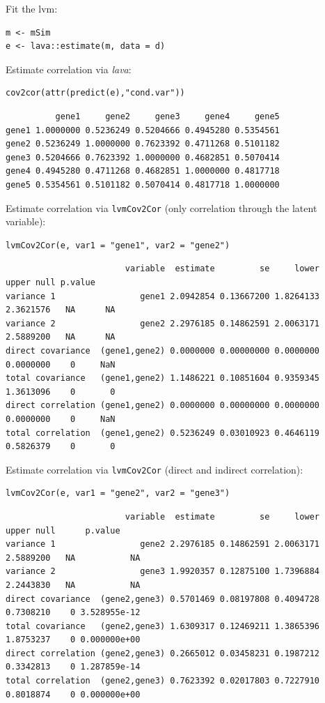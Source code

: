 \documentclass{article}
\begin{document}
Fit the lvm:
\lstset{language=r,label= ,caption= ,captionpos=b,numbers=none}
\begin{lstlisting}
m <- mSim
e <- lava::estimate(m, data = d)
\end{lstlisting}
Estimate correlation via \emph{lava}:
\lstset{language=r,label= ,caption= ,captionpos=b,numbers=none}
\begin{lstlisting}
cov2cor(attr(predict(e),"cond.var"))
\end{lstlisting}

\begin{verbatim}
          gene1     gene2     gene3     gene4     gene5
gene1 1.0000000 0.5236249 0.5204666 0.4945280 0.5354561
gene2 0.5236249 1.0000000 0.7623392 0.4711268 0.5101182
gene3 0.5204666 0.7623392 1.0000000 0.4682851 0.5070414
gene4 0.4945280 0.4711268 0.4682851 1.0000000 0.4817718
gene5 0.5354561 0.5101182 0.5070414 0.4817718 1.0000000
\end{verbatim}


Estimate correlation via \texttt{lvmCov2Cor} (only correlation through the latent variable):
\lstset{language=r,label= ,caption= ,captionpos=b,numbers=none}
\begin{lstlisting}
lvmCov2Cor(e, var1 = "gene1", var2 = "gene2")
\end{lstlisting}

\begin{verbatim}
                        variable  estimate         se     lower     upper null p.value
variance 1                 gene1 2.0942854 0.13667200 1.8264133 2.3621576   NA      NA
variance 2                 gene2 2.2976185 0.14862591 2.0063171 2.5889200   NA      NA
direct covariance  (gene1,gene2) 0.0000000 0.00000000 0.0000000 0.0000000    0     NaN
total covariance   (gene1,gene2) 1.1486221 0.10851604 0.9359345 1.3613096    0       0
direct correlation (gene1,gene2) 0.0000000 0.00000000 0.0000000 0.0000000    0     NaN
total correlation  (gene1,gene2) 0.5236249 0.03010923 0.4646119 0.5826379    0       0
\end{verbatim}


Estimate correlation via \texttt{lvmCov2Cor} (direct and indirect correlation):
\lstset{language=r,label= ,caption= ,captionpos=b,numbers=none}
\begin{lstlisting}
lvmCov2Cor(e, var1 = "gene2", var2 = "gene3")
\end{lstlisting}

\begin{verbatim}
                        variable  estimate         se     lower     upper null      p.value
variance 1                 gene2 2.2976185 0.14862591 2.0063171 2.5889200   NA           NA
variance 2                 gene3 1.9920357 0.12875100 1.7396884 2.2443830   NA           NA
direct covariance  (gene2,gene3) 0.5701469 0.08197808 0.4094728 0.7308210    0 3.528955e-12
total covariance   (gene2,gene3) 1.6309317 0.12469211 1.3865396 1.8753237    0 0.000000e+00
direct correlation (gene2,gene3) 0.2665012 0.03458231 0.1987212 0.3342813    0 1.287859e-14
total correlation  (gene2,gene3) 0.7623392 0.02017803 0.7227910 0.8018874    0 0.000000e+00
\end{verbatim}
\end{document}
